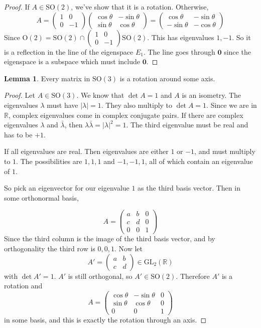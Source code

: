 \documentclass[a4paper]{article}
\theoremstyle{definition}
\newtheorem*{lemma}{Lemma}
\newcommand{\mb}[1]{\mathbf{#1}}
\newcommand{\R}{\mathbb{R}}
\newcommand{\GL}{\mathrm{GL}}
\newcommand{\Or}{\mathrm{O}}
\newcommand{\SO}{\mathrm{SO}}
\begin{document}
\begin{proof}
  If $A\in \SO(2)$, we've show that it is a rotation. Otherwise,
  \[
  A = 
  \begin{pmatrix}
    1 & 0\\
    0 & -1
  \end{pmatrix}
  \begin{pmatrix}
    \cos\theta & -\sin\theta\\
    \sin\theta & \cos\theta
  \end{pmatrix} = 
  \begin{pmatrix}
    \cos\theta & -\sin\theta \\
    -\sin\theta & -\cos\theta
  \end{pmatrix}
  \]
  Since $\Or(2) = \SO(2)\cap 
\begin{pmatrix}
  1&0\\0&-1
\end{pmatrix}\SO(2)$. This has eigenvalues $1, -1$. So it is a reflection in the line of the eigenspace $E_1$. The line goes through $\mb{0}$ since the eigenspace is a subspace which must include $\mb{0}$.
\end{proof}

\begin{lemma}
  Every matrix in $\SO(3)$ is a rotation around some axis. 
\end{lemma}

\begin{proof}
  Let $A\in \SO(3)$. We know that $\det A = 1$ and $A$ is an isometry. The eigenvalues $\lambda$ must have $|\lambda| = 1$. They also multiply to $\det A = 1$. Since we are in $\R$, complex eigenvalues come in complex conjugate pairs. If there are complex eigenvalues $\lambda$ and $\bar\lambda$, then $\lambda\bar\lambda = |\lambda|^2 = 1$. The third eigenvalue must be real and has to be $+1$.

If all eigenvalues are real. Then eigenvalues are either $1$ or $-1$, and must multiply to $1$. The possibilities are $1, 1, 1$ and $-1, -1, 1$, all of which contain an eigenvalue of $1$.

So pick an eigenvector for our eigenvalue $1$ as the third basis vector. Then in some orthonormal basis,

\[
A = \begin{pmatrix}
  a & b & 0\\
  c & d & 0\\
  0 & 0 & 1
\end{pmatrix}
\]
Since the third column is the image of the third basis vector, and by orthogonality the third row is $0, 0, 1$. Now let
\[A' = \begin{pmatrix}
  a & b\\
  c & d
\end{pmatrix} \in \GL_2(\R)
\]
with $\det A' = 1$. $A'$ is still orthogonal, so $A'\in \SO(2)$. Therefore $A'$ is a rotation and
\[
A = 
\begin{pmatrix}
  \cos\theta & -\sin\theta & 0\\
  \sin\theta & \cos\theta & 0\\
  0 & 0 & 1
\end{pmatrix}
\]
in some basis, and this is exactly the rotation through an axis.
\end{proof}
\end{document}

